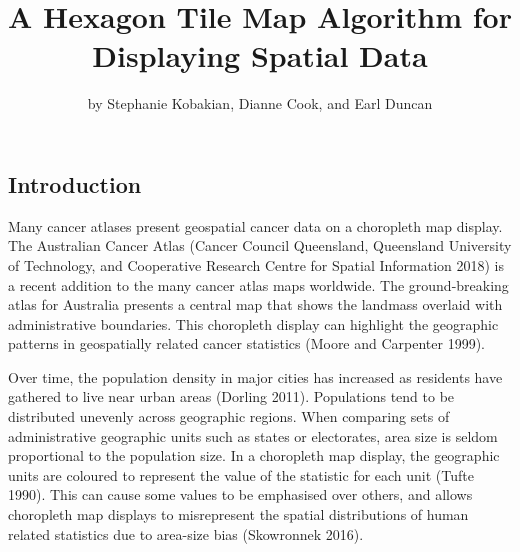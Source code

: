 \title{A Hexagon Tile Map Algorithm for Displaying Spatial Data}
\author{by Stephanie Kobakian, Dianne Cook, and Earl Duncan}

\maketitle


\hypertarget{introduction}{%
\subsection{Introduction}\label{introduction}}

Many cancer atlases present geospatial cancer data on a choropleth map display. The Australian Cancer Atlas (Cancer Council Queensland, Queensland University of Technology, and Cooperative Research Centre for Spatial Information 2018) is a recent addition to the many cancer atlas maps worldwide. The ground-breaking atlas for Australia presents a central map that shows the landmass overlaid with administrative boundaries. This choropleth display can highlight the geographic patterns in geospatially related cancer statistics (Moore and Carpenter 1999).

Over time, the population density in major cities has increased as residents have gathered to live near urban areas (Dorling 2011). Populations tend to be distributed unevenly across geographic regions. When comparing sets of administrative geographic units such as states or electorates, area size is seldom proportional to the population size. In a choropleth map display, the geographic units are coloured to represent the value of the statistic for each unit (Tufte 1990). This can cause some values to be emphasised over others, and allows choropleth map displays to misrepresent the spatial distributions of human related statistics due to area-size bias (Skowronnek 2016).

